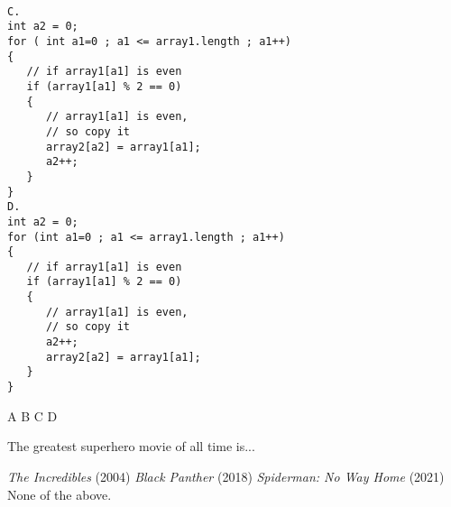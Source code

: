 \documentclass{exam}
\begin{document}
\begin{questions}
\begin{multicols}{2}
\begin{lstlisting}

C.
int a2 = 0;
for ( int a1=0 ; a1 <= array1.length ; a1++)
{
   // if array1[a1] is even
   if (array1[a1] % 2 == 0)
   {
      // array1[a1] is even,
      // so copy it
      array2[a2] = array1[a1];
      a2++;
   }
}
D.
int a2 = 0;
for (int a1=0 ; a1 <= array1.length ; a1++)
{
   // if array1[a1] is even
   if (array1[a1] % 2 == 0)
   {
      // array1[a1] is even,
      // so copy it
      a2++;
      array2[a2] = array1[a1];
   }
}

\end{lstlisting}
\end{multicols}
\begin{choices}
\choice  A
\choice B
\choice C
\choice  D
\end{choices}

\question
The greatest superhero movie of all time is...

\begin{choices}

\choice \textit{The Incredibles} (2004)
\choice \textit{Black Panther} (2018)
\choice \textit{Spiderman: No Way Home} (2021)
\choice None of the above.
\end{choices}


\end{questions}



\newpage
\end{document}
